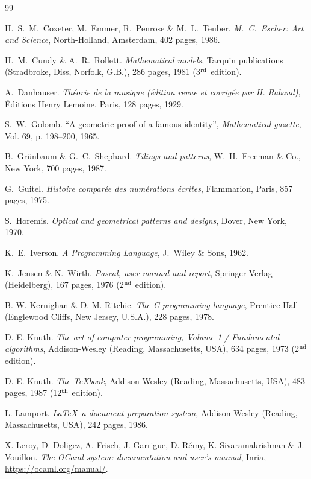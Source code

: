 \begin{thebibliography}{99}

 H.~S.~M.~Coxeter, M.~Emmer, R.~Penrose \& M.~L.~Teuber.
{\em M.~C.~Escher: Art and Science}, North-Holland, Amsterdam, 
402 pages, 1986.

 H.~M.~Cundy \& A.~R.~Rollett.
{\em Mathematical models}, Tarquin publications (Stradbroke, Diss, Norfolk, G.B.), 
286 pages, 1981 (3$^{\rm rd}$ edition).

 A.~Danhauser.
{\em Théorie de la musique (édition revue et corrigée par H. Rabaud)}, 
Éditions Henry Lemoine, Paris, 128  pages, 1929.

 S.~W.~Golomb.
``A geometric proof of a famous identity'', 
{\em Mathematical gazette}, Vol. 69, p. 198--200, 1965.

 B.~Grünbaum \& G.~C.~Shephard.
{\em Tilings and patterns}, W.~H.~Freeman \& Co., New York, 700 pages, 1987.

 G.~Guitel.
{\em Histoire comparée des numérations écrites}, 
Flammarion, Paris, 857 pages, 1975.

 S.~Horemis.
{\em Optical and geometrical patterns and designs}, Dover, New York, 1970.

 K.~E.~Iverson.
{\em A Programming Language}, J.~Wiley \& Sons, 1962.

 K.~Jensen \& N.~Wirth.
{\em Pascal, user manual and report}, Springer-Verlag (Heidelberg), 
167 pages, 1976 (2$^{\rm nd}$ edition).

 B. W. Kernighan \& D. M. Ritchie.
{\em The C programming language}, Prentice-Hall (Englewood Cliffs, New Jersey, U.S.A.),
228 pages, 1978.

 D. E. Knuth.
{\em The art of computer programming, Volume 1 / Fundamental algorithms}, 
Addison-Wesley (Reading, Massachusetts, USA), 
634 pages, 1973 (2$^{\rm nd}$ edition).

 D. E. Knuth.
{\em The \TeX book}, Addison-Wesley (Reading, Massachusetts, USA), 
483 pages, 1987 (12$^{\rm th}$ edition).

 L. Lamport.
{\em \LaTeX\ a document preparation system}, Addison-Wesley (Reading, Massachusetts, USA), 
242 pages, 1986.

 X. Leroy, D. Doligez, A. Frisch, J. Garrigue, D. Rémy, K. Sivaramakrishnan
\& J. Vouillon. {\em The OCaml system: documentation and user's manual}, Inria, 
\url{https://ocaml.org/manual/}.


\end{thebibliography}
